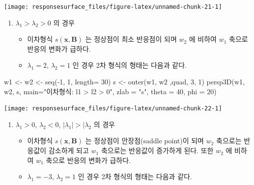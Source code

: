 \documentclass[
]{book}
\newenvironment{Shaded}{\begin{snugshade}}{\end{snugshade}}
\newcommand{\AttributeTok}[1]{\textcolor[rgb]{0.77,0.63,0.00}{#1}}
\newcommand{\DecValTok}[1]{\textcolor[rgb]{0.00,0.00,0.81}{#1}}
\newcommand{\FunctionTok}[1]{\textcolor[rgb]{0.00,0.00,0.00}{#1}}
\newcommand{\NormalTok}[1]{#1}
\newcommand{\OtherTok}[1]{\textcolor[rgb]{0.56,0.35,0.01}{#1}}
\newcommand{\SpecialCharTok}[1]{\textcolor[rgb]{0.00,0.00,0.00}{#1}}
\newcommand{\StringTok}[1]{\textcolor[rgb]{0.31,0.60,0.02}{#1}}
\newcommand{\bm}[1]{\boldsymbol{\mathbf{#1}}}
\theoremstyle{definition}
\theoremstyle{definition}
\theoremstyle{definition}
\theoremstyle{definition}
\theoremstyle{remark}
\begin{document}
\begin{center}\texttt{[image: responsesurface\_files/figure-latex/unnamed-chunk-21-1]} \end{center}

\begin{enumerate}
\def\labelenumi{\arabic{enumi}.}
\setcounter{enumi}{1}
\item
  \(\lambda_1 > \lambda_2 > 0\) 의 경우

  \begin{itemize}
  \item
    이차형식 \(s(\bm x, \bm B)\) 는 정상점이 최소 반응점이 되며 \(w_2\) 에 비하여 \(w_1\) 축으로 반응의 변화가 급하다.
  \item
    \(\lambda_1 =2\), \(\lambda_2 =1\) 인 경우 2차 형식의 형태는 다음과 같다.
  \end{itemize}
\end{enumerate}

\begin{Shaded}
\begin{Highlighting}[]
\NormalTok{w1 }\OtherTok{\textless{}{-}}\NormalTok{ w2 }\OtherTok{\textless{}{-}} \FunctionTok{seq}\NormalTok{(}\SpecialCharTok{{-}}\DecValTok{1}\NormalTok{, }\DecValTok{1}\NormalTok{, }\AttributeTok{length=} \DecValTok{30}\NormalTok{)}
\NormalTok{s }\OtherTok{\textless{}{-}} \FunctionTok{outer}\NormalTok{(w1, w2 ,quad, }\DecValTok{3}\NormalTok{, }\DecValTok{1}\NormalTok{)}
\FunctionTok{persp3D}\NormalTok{(w1, w2, s,}
      \AttributeTok{main=}\StringTok{"이차형식: l1 \textgreater{} l2 \textgreater{}  0"}\NormalTok{,}
      \AttributeTok{zlab =} \StringTok{"s"}\NormalTok{,}
      \AttributeTok{theta =} \DecValTok{40}\NormalTok{, }\AttributeTok{phi =} \DecValTok{20}\NormalTok{)}
\end{Highlighting}
\end{Shaded}

\begin{center}\texttt{[image: responsesurface\_files/figure-latex/unnamed-chunk-22-1]} \end{center}

\begin{enumerate}
\def\labelenumi{\arabic{enumi}.}
\setcounter{enumi}{2}
\item
  \(\lambda_1 >0\), \(\lambda_2 <0\), \(|\lambda_1| > |\lambda_2\) 의 경우

  \begin{itemize}
  \item
    이차형식 \(s(\bm x, \bm B)\) 는 정상점이 안장점(saddle point)이 되며 \(w_2\) 축으로는 반응값이 감소하게 되고 \(w_1\) 축으로는 반응값이 증가하게 된다. 또한 \(w_2\) 에 비하여 \(w_1\) 축으로 반응의 변화가 급하다.
  \item
    \(\lambda_1 = - 3\), \(\lambda_2 =1\) 인 경우 2차 형식의 형태는 다음과 같다.
  \end{itemize}
\end{enumerate}
\end{document}
